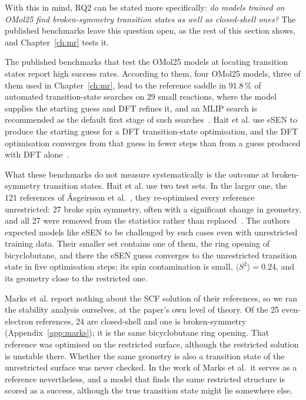 With this in mind, RQ2 can be stated more specifically: \emph{do models
trained on OMol25 find broken-symmetry transition states as well as
closed-shell ones?} The published benchmarks leave this question open,
as the rest of this section shows, and Chapter~\ref{ch:mr} tests it.

The published benchmarks that test the OMol25 models at locating
transition states report high success rates. According to them, four
OMol25 models, three
of them used in Chapter~\ref{ch:mr}, lead to the reference saddle in 91.8\,\% of
automated transition-state searches on 29 small reactions, where the
model supplies the starting guess and DFT refines it, and an MLIP search
is recommended as the default first stage of such
searches~\cite{marks2026}. Hait et
al. use eSEN to produce the starting guess for a DFT transition-state
optimisation, and the DFT optimisation converges from that guess in
fewer steps than from a guess produced with DFT alone~\cite{hait2025}.

What these benchmarks do not measure systematically is the outcome at
broken-symmetry transition states. Hait et al. use two test sets. In
the larger one, the 121 references of \'Asgeirsson et
al.~\cite{asgeirsson2021}, they re-optimised every reference
unrestricted: 27 broke spin symmetry, often with a significant change
in geometry, and all 27 were removed from the statistics rather than
replaced~\cite{hait2025}. The authors expected models like eSEN to be
challenged by such cases even with unrestricted training data. Their
smaller set contains one of them, the ring opening of bicyclobutane,
and there the eSEN guess converges to the unrestricted transition state
in five optimisation steps; its spin contamination is small,
$\langle S^2\rangle = 0.24$, and its geometry close to the restricted
one.

Marks et al. report nothing about the SCF solution of their references,
so we ran the stability analysis ourselves, at the paper's own level of
theory. Of the 25 even-electron references, 24 are closed-shell and one
is broken-symmetry (Appendix~\ref{app:marks}); it is the same
bicyclobutane ring opening. That reference was optimised on the
restricted surface, although the restricted solution is unstable there.
Whether the same geometry is also a transition state of the
unrestricted surface was never checked. In the work of Marks et al.\ it
serves as a reference nevertheless, and a model that finds the same
restricted structure is scored as a success, although the true
transition state might lie somewhere else.

